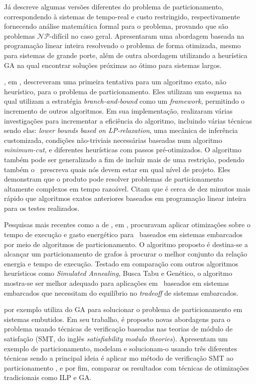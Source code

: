 	Já \cite{Arato2003} descreve algumas versões diferentes do problema de particionamento, correspondendo à sistemas de tempo-real e custo restringido, respectivamente fornecendo análise matemática formal para o problema, provando que são problemas $ \mathcal{NP} $-difícil no caso geral. Apresentaram uma abordagem baseada na programação linear inteira resolvendo o problema de forma otimizada, mesmo para sistemas de grande porte, além de outra abordagem utilizando a heurística GA na qual encontrar soluções próximas ao ótimo para sistemas largos.

	\cite{Mann2007}, em \cite{Mann2007}, descreveram uma primeira tentativa para um algoritmo exato, não heurístico, para o problema de particionamento. Eles utilizam um esquema na qual utilizam a estratégia \textit{branch-and-bound} como um \textit{framework}, permitindo o incremento de outros algoritmos. Em sua implementação, realizaram várias investigações para incrementar a eficiência do algoritmo, incluindo várias técnicas sendo elas: \textit{lower bounds based on LP-relaxation}, uma mecânica de inferência customizada, condições não-triviais necessárias baseadas num algoritmo \textit{minimum-cut}, e diferentes heurísticas com passos pré-otimizados. O algoritmo também pode ser generalizado a fim de incluir mais de uma restrição, podendo também o \designer\ prescreva quais nós devem estar em qual nível de projeto. Eles demonstram que o produto pode resolver problemas de particionamento altamente complexos em tempo razoável. Citam que é cerca de dez minutos mais rápido que algoritmos exatos anteriores baseados em programação linear inteira para os testes realizados.

	Pesquisas mais recentes como a de \cite{Hassine2017}, em \cite{Hassine2017}, procuravam aplicar otimizações sobre o tempo de execução e gasto energético para \cores\ baseados em sistemas embarcados por meio de algoritmos de particionamento.
	O algoritmo proposto é destina-se a alcançar um particionamento de grafos à procurar o melhor conjunto da relação energia e tempo de execução.
	Testado em comparação com outros algoritmos heurísticos como \textit{Simulated Annealing}, Busca Tabu e Genético, o algoritmo mostra-se ser melhor adequado para aplicações em \cores\ baseados em sistemas embarcados que necessitam do equilíbrio no \textit{tradeoff} de sistemas embarcados.

	\cite{Trindade2016} por exemplo utiliza do GA para solucionar o problema de particionamento em sistemas embutidos. Em seu trabalho, é proposto novas abordagens para o problema usando técnicas de verificação baseadas nas teorias de módulo de satisfação (SMT, do inglês \textit{satisfiability modulo theories}). Apresentam um exemplo de particionamento, modelam e solucionam-o usando três diferentes técnicas sendo a principal ideia é aplicar mo método de verificação SMT ao particionamento \hs, e por fim, comparar os resultados com técnicas de otimizações tradicionais como ILP e GA.

